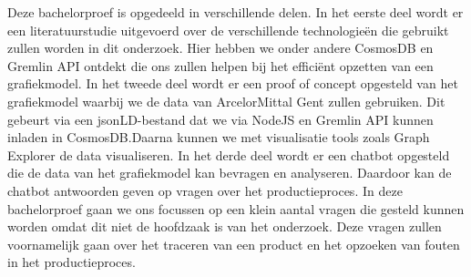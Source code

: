 Deze bachelorproef is opgedeeld in verschillende delen.
In het eerste deel wordt er een literatuurstudie uitgevoerd over de verschillende technologieën die gebruikt zullen worden in dit onderzoek.
Hier hebben we onder andere CosmosDB en Gremlin API ontdekt die ons zullen helpen bij het efficiënt opzetten van een grafiekmodel.
In het tweede deel wordt er een proof of concept opgesteld van het grafiekmodel waarbij we de data van ArcelorMittal Gent zullen gebruiken.
Dit gebeurt via een jsonLD-bestand dat we via NodeJS en Gremlin API kunnen inladen in CosmosDB.\@ Daarna kunnen we met visualisatie tools zoals Graph Explorer de data visualiseren.
In het derde deel wordt er een chatbot opgesteld die de data van het grafiekmodel kan bevragen en analyseren. 
Daardoor kan de chatbot antwoorden geven op vragen over het productieproces.
In deze bachelorproef gaan we ons focussen op een klein aantal vragen die gesteld kunnen worden omdat dit niet de hoofdzaak is van het onderzoek.
Deze vragen zullen voornamelijk gaan over het traceren van een product en het opzoeken van fouten in het productieproces.